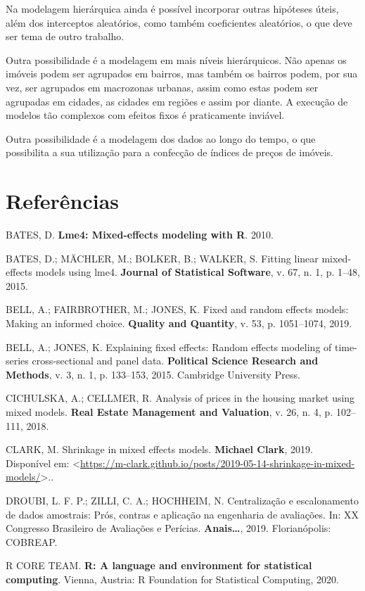 \documentclass[
  a4paper, 12pt]{article}
\begin{document}
Na modelagem hierárquica ainda é possível incorporar outras hipóteses
úteis, além dos interceptos aleatórios, como também coeficientes
aleatórios, o que deve ser tema de outro trabalho.

Outra possibilidade é a modelagem em mais níveis hierárquicos. Não
apenas os imóveis podem ser agrupados em bairros, mas também os bairros
podem, por sua vez, ser agrupados em macrozonas urbanas, assim como
estas podem ser agrupadas em cidades, as cidades em regiões e assim por
diante. A execução de modelos tão complexos com efeitos fixos é
praticamente inviável.

Outra possibilidade é a modelagem dos dados ao longo do tempo, o que
possibilita a sua utilização para a confecção de índices de preços de
imóveis.

\hypertarget{referuxeancias}{%
\section*{Referências}\label{referuxeancias}}

\hypertarget{refs}{}
\leavevmode\hypertarget{ref-Batesbook}{}%
BATES, D. \textbf{Lme4: Mixed-effects modeling with R}. 2010.

\leavevmode\hypertarget{ref-Bates}{}%
BATES, D.; MÄCHLER, M.; BOLKER, B.; WALKER, S. Fitting linear
mixed-effects models using lme4. \textbf{Journal of Statistical
Software}, v. 67, n. 1, p. 1--48, 2015.

\leavevmode\hypertarget{ref-bell2019}{}%
BELL, A.; FAIRBROTHER, M.; JONES, K. Fixed and random effects models:
Making an informed choice. \textbf{Quality and Quantity}, v. 53, p.
1051--1074, 2019.

\leavevmode\hypertarget{ref-bell2015}{}%
BELL, A.; JONES, K. Explaining fixed effects: Random effects modeling of
time-series cross-sectional and panel data. \textbf{Political Science
Research and Methods}, v. 3, n. 1, p. 133--153, 2015. Cambridge
University Press.

\leavevmode\hypertarget{ref-polonia}{}%
CICHULSKA, A.; CELLMER, R. Analysis of prices in the housing market
using mixed models. \textbf{Real Estate Management and Valuation}, v.
26, n. 4, p. 102--111, 2018.

\leavevmode\hypertarget{ref-clark2019shrinkage}{}%
CLARK, M. Shrinkage in mixed effects models. \textbf{Michael Clark},
2019. Disponível em:
\textless{}\url{https://m-clark.github.io/posts/2019-05-14-shrinkage-in-mixed-models/}\textgreater..

\leavevmode\hypertarget{ref-droubi2019}{}%
DROUBI, L. F. P.; ZILLI, C. A.; HOCHHEIM, N. Centralização e
escalonamento de dados amostrais: Prós, contras e aplicação na
engenharia de avaliações. In: XX Congresso Brasileiro de Avaliações e
Perícias. \textbf{Anais\ldots{}}, 2019. Florianópolis: COBREAP.

\leavevmode\hypertarget{ref-R}{}%
R CORE TEAM. \textbf{R: A language and environment for statistical
computing}. Vienna, Austria: R Foundation for Statistical Computing,
2020.
\end{document}
